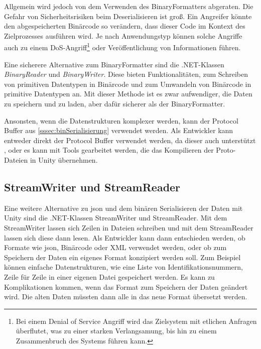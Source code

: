 Allgemein wird jedoch von dem Verwenden des BinaryFormatters abgeraten. Die Gefahr von Sicherheitsrisiken beim Deserialisieren ist groß. Ein Angreifer könnte den abgespeicherten Binärcode so verändern, dass dieser Code im Kontext des Zielprozesses ausführen wird. Je nach Anwendungstyp können solche Angriffe auch zu einem DoS-Angriff\footnote{Bei einem Denial of Service Angriff wird das Zielsystem mit etlichen Anfragen überflutet, was zu einer starken Verlangsamung, bis hin zu einem Zusammenbruch des Systems führen kann.\cite{bundDoSDDoSAttacken}} oder Veröffentlichung von Informationen führen.\cite{microsoftDeserializationRisks}

Eine sicherere Alternative zum BinaryFormatter sind die .NET-Klassen \textit{BinaryReader} und \textit{BinaryWriter}. Diese bieten Funktionalitäten, zum Schreiben von primitiven Datentypen in Binärcode und zum Umwandeln von Binärcode in primitive Datentypen an. Mit dieser Methode ist es zwar aufwendiger, die Daten zu speichern und zu laden, aber dafür sicherer als der BinaryFormatter.\cite{microsoftBinaryReaderClass}\cite{microsoftBinaryWriterClass} 

Ansonsten, wenn die Datenstrukturen komplexer werden, kann der Protocol Buffer aus \ref{sssec:binSerialisierung} verwendet werden. Als Entwickler kann entweder direkt der Protocol Buffer verwendet werden, da dieser auch \csharp{} unterstützt \cite{protobufLanguageGuide}, oder es kann mit Tools gearbeitet werden, die das Kompilieren der Proto-Dateien in Unity übernehmen.\cite{githubProtobufUnity}



\subsection{StreamWriter und StreamReader}
Eine weitere Alternative zu \ac{json} und dem binären Serialisieren der Daten mit Unity sind die .NET-Klassen StreamWriter und StreamReader. Mit dem StreamWriter lassen sich Zeilen in Dateien schreiben und mit dem StreamReader lassen sich diese dann lesen.\cite{microsoftStreamWriterKlasse}\cite{microsoftStreamReaderKlasse} Als Entwickler kann dann entschieden werden, ob Formate wie \ac{json}, Binärcode oder XML verwendet werden, oder ob zum Speichern der Daten ein eigenes Format konzipiert werden soll. Zum Beispiel können einfache Datenstrukturen, wie eine Liste von Identifikationsnummern, Zeile für Zeile in einer eigenen Datei gespeichert werden. Es kann zu Komplikationen kommen, wenn das Format zum Speichern der Daten geändert wird. Die alten Daten müssten dann alle in das neue Format übersetzt werden.




